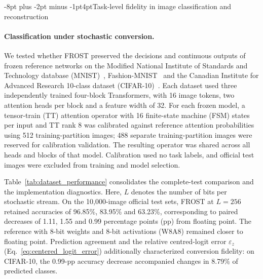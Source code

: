 \documentclass[pdflatex,sn-mathphys-num]{sn-jnl}
\makeatletter
\renewcommand\subsection{\@startsection{subsection}{2}{\z@}%
  {-8pt plus -2pt minus -1pt}{4pt}{\subsectionfont}}
\theoremstyle{thmstyleone}
\theoremstyle{thmstyletwo}
\theoremstyle{thmstylethree}
\makeatother
\begin{document}

\subsection{Task-level fidelity in image classification and reconstruction}
\label{sec:dataset_validation}

\paragraph{Classification under stochastic conversion.}
We tested whether FROST preserved the decisions and continuous outputs of
frozen reference networks on the Modified National Institute of Standards
and Technology database (MNIST)~\cite{lecun1998gradient},
Fashion-MNIST~\cite{xiao2017fashion} and the Canadian Institute for Advanced
Research 10-class dataset (CIFAR-10)~\cite{krizhevsky2009learning}.
Each dataset used three independently trained four-block Transformers,
with 16 image tokens, two attention heads per block and a feature width
of 32. For each frozen model, a tensor-train (TT) attention operator with
16 finite-state machine (FSM) states per input and TT rank 8 was calibrated
against reference attention probabilities using 512 training-partition
images; 488 separate training-partition images were reserved for
calibration validation. The resulting operator was shared across all
heads and blocks of that model. Calibration used no task labels, and
official test images were excluded from training and model selection.

Table~\ref{tab:dataset_performance} consolidates the complete-test
comparison and the implementation diagnostics. Here, $L$ denotes the
number of bits per stochastic stream. On the 10,000-image official test
sets, FROST at $L=256$ retained accuracies of 96.85\%, 83.95\% and
63.23\%, corresponding to paired decreases of 1.11, 1.55 and 0.99
percentage points (pp) from floating point. The reference with 8-bit
weights and 8-bit activations (W8A8) remained closer to floating point.
Prediction agreement and the relative centred-logit error
$\varepsilon_z$ (Eq.~\eqref{eq:centered_logit_error}) additionally
characterized conversion fidelity: on CIFAR-10, the 0.99-pp accuracy
decrease accompanied changes in 8.79\% of predicted classes.
\end{document}
